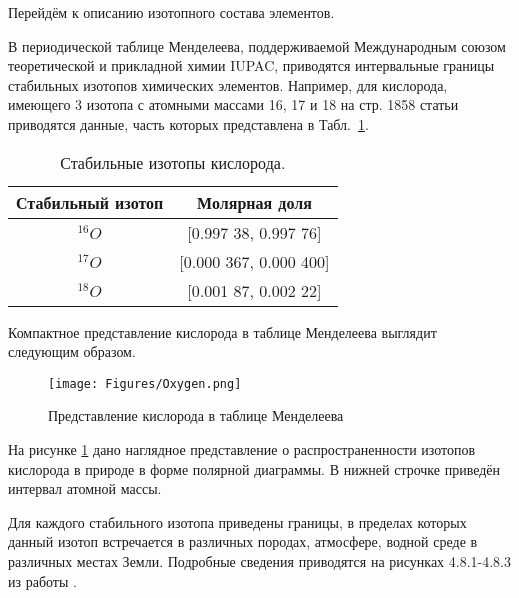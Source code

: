 \documentclass[a5paper,openany]{book}
\begin{document}
Перейдём к описанию изотопного состава элементов.

В периодической таблице Менделеева, поддерживаемой Международным союзом теоретической 
и прикладной химии IUPAC, приводятся интервальные границы стабильных изотопов химических 
элементов. Например, для кислорода, имеющего 3 изотопа с атомными массами 16, 17 и 18 
на стр. 1858 статьи \cite{IUPAC} приводятся данные, часть которых представлена 
в Табл.~\ref{IUPACOxygen}. 


\begin{table}[h!]
	\centering
	\caption{Стабильные изотопы кислорода.} 
	\medskip 
	\begin{tabular}{|c|c|}
		\hline
		Стабильный  изотоп & Молярная доля \\
		\hline 
		$^{16}O$ & [0.997 38, 0.997 76] \\
		$^{17}O$ & [0.000 367, 0.000 400] \\
		$^{18}O$ & [0.001 87, 0.002 22] \\			
		\hline
	\end{tabular}
	\label{IUPACOxygen}
\end{table} 


Компактное представление кислорода в таблице Менделеева выглядит следующим образом.

\begin{figure}[ht] 
	\centering\small
	\texttt{[image: Figures/Oxygen.png]}
	\caption{Представление кислорода в таблице Менделеева} 
	\label{f:Oxygen}
\end{figure}	
На рисунке \ref{f:Oxygen} дано наглядное представление о распространенности изотопов кислорода в природе в форме полярной диаграммы. В нижней строчке приведён интервал атомной массы.

Для каждого стабильного изотопа приведены границы, в пределах которых данный изотоп 
встречается в различных породах, атмосфере, водной среде в различных местах Земли. 
Подробные сведения приводятся на рисунках 4.8.1-4.8.3 из работы \cite{IUPAC}. 
\end{document}
